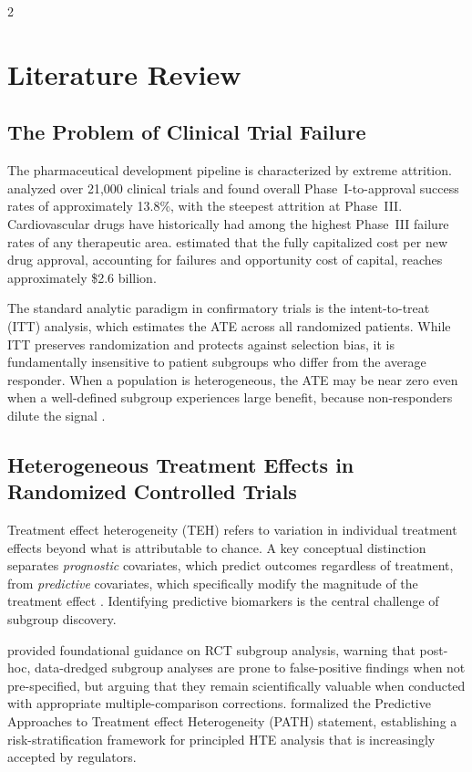 \documentclass[12pt]{article}
\begin{document}
\begin{multicols}{2}
\section{Literature Review}

\subsection{The Problem of Clinical Trial Failure}

The pharmaceutical development pipeline is characterized by extreme
attrition.  \citet{wong2019estimation} analyzed over 21,000 clinical trials
and found overall Phase~I-to-approval success rates of approximately 13.8\%,
with the steepest attrition at Phase~III. Cardiovascular drugs have
historically had among the highest Phase~III failure rates of any therapeutic
area.  \citet{dimasi2016innovation} estimated that the fully capitalized cost
per new drug approval, accounting for failures and opportunity cost of
capital, reaches approximately \$2.6 billion.

The standard analytic paradigm in confirmatory trials is the
intent-to-treat (ITT) analysis, which estimates the ATE across all
randomized patients.  While ITT preserves randomization and protects against
selection bias, it is fundamentally insensitive to patient subgroups who
differ from the average responder.  When a population is heterogeneous, the
ATE may be near zero even when a well-defined subgroup experiences large
benefit, because non-responders dilute the signal \citep{rothwell2005subgroup}.

\subsection{Heterogeneous Treatment Effects in Randomized Controlled Trials}

Treatment effect heterogeneity (TEH) refers to variation in individual
treatment effects beyond what is attributable to chance.  A key conceptual
distinction separates \textit{prognostic} covariates, which predict outcomes
regardless of treatment, from \textit{predictive} covariates, which
specifically modify the magnitude of the treatment effect
\citep{simon2010predictive}.  Identifying predictive biomarkers is the
central challenge of subgroup discovery.

\citet{rothwell2005subgroup} provided foundational guidance on RCT subgroup
analysis, warning that post-hoc, data-dredged subgroup analyses are prone to
false-positive findings when not pre-specified, but arguing that they remain
scientifically valuable when conducted with appropriate multiple-comparison
corrections.  \citet{kent2020predictive} formalized the Predictive
Approaches to Treatment effect Heterogeneity (PATH) statement, establishing
a risk-stratification framework for principled HTE analysis that is
increasingly accepted by regulators.


\end{multicols}
\end{document}
